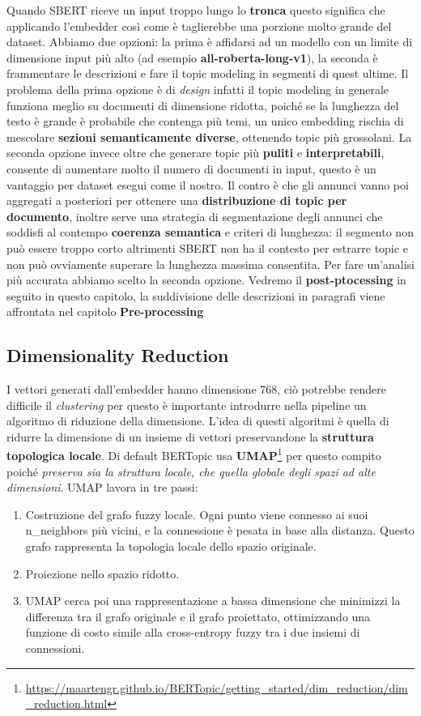 Quando SBERT riceve un input troppo lungo lo \textbf{tronca} questo significa che applicando l'embedder così come è taglierebbe una porzione molto grande del dataset.
Abbiamo due opzioni: la prima è affidarsi ad un modello con un limite di dimensione input più alto (ad esempio \textbf{all-roberta-long-v1}), la seconda è frammentare le descrizioni e fare il topic modeling in segmenti di quest ultime.
Il problema della prima opzione è di \emph{design} infatti il topic modeling in generale funziona meglio su documenti di dimensione ridotta, poiché se la lunghezza del testo è grande è probabile che contenga più temi, un unico embedding rischia di mescolare \textbf{sezioni semanticamente diverse}, ottenendo topic più grossolani.
La seconda opzione invece oltre che generare topic più \textbf{puliti} e \textbf{interpretabili}, consente di aumentare molto il numero di documenti in input, questo è un vantaggio per dataset esegui come il nostro.
Il contro è che gli annunci vanno poi aggregati a posteriori per ottenere una \textbf{distribuzione di topic per documento}, inoltre serve una strategia di segmentazione degli annunci che soddisfi al contempo \textbf{coerenza semantica} e criteri di lunghezza: il segmento non può essere troppo corto altrimenti SBERT non ha il contesto per estrarre topic e non può ovviamente superare la lunghezza massima consentita.
Per fare un'analisi più accurata abbiamo scelto la seconda opzione.
Vedremo il \textbf{post-ptocessing} in seguito in questo capitolo, la suddivisione delle descrizioni in paragrafi viene affrontata nel capitolo \textbf{Pre-processing}
\subsection{Dimensionality Reduction}
I vettori generati dall'embedder hanno dimensione 768, ciò potrebbe rendere difficile il \emph{clustering} per questo è importante introdurre nella pipeline un algoritmo di riduzione della dimensione.
L'idea di questi algoritmi è quella di ridurre la dimensione di un insieme di vettori preservandone la \textbf{struttura topologica locale}.
Di default BERTopic usa \textbf{UMAP}\footnote{\url{https://maartengr.github.io/BERTopic/getting_started/dim_reduction/dim_reduction.html}} per questo compito poiché \emph{preserva sia la struttura locale, che quella globale degli spazi ad alte dimensioni}.
UMAP lavora in tre passi:
\begin{enumerate}
\item Costruzione del grafo fuzzy locale. Ogni punto viene connesso ai suoi n\_neighbors più vicini, e la connessione è pesata in base alla distanza. Questo grafo rappresenta la topologia locale dello spazio originale.
\item Proiezione nello spazio ridotto.
\item UMAP cerca poi una rappresentazione a bassa dimensione che minimizzi la differenza tra il grafo originale e il grafo proiettato, ottimizzando una funzione di costo simile alla cross-entropy fuzzy tra i due insiemi di connessioni.
\end{enumerate}


